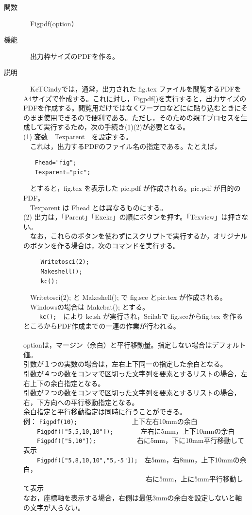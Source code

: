 \documentclass[papersize,a4paper,12pt,uplatex]{jsarticle}
\begin{document}
\begin{description}
\hypertarget{figpdf}{}
\item[関数]　Figpdf(option）
\item[機能]　出力枠サイズのPDFを作る。
\item[説明]　KeTCindyでは，通常，出力された fig.tex ファイルを閲覧するPDFをA4サイズで作成する。これに対し，Figpdf()を実行すると，出力サイズのPDFを作成する。閲覧用だけではなくワープロなどにに貼り込むときにそのまま使用できるので便利である。ただし，そのための親子プロセスを生成して実行するため，次の手続き(1)(2)が必要となる。\\
(1) 変数　Texparent　を設定する。\\
　これは，出力するPDFのファイル名の指定である。たとえば，
\begin{verbatim}
　　Fhead="fig";
　　Texparent="pic";
\end{verbatim}
　とすると，fig.tex を表示した pic.pdf が作成される。pic.pdf が目的のPDF。\\
　Texparent は Fhead とは異なるものにする。\\
(2) 出力は，「Parent」「Exekc」の順にボタンを押す。「Texview」は押さない。\\
　なお，これらのボタンを使わずにスクリプトで実行するか，オリジナルのボタンを作る場合は，次のコマンドを実行する。
\begin{verbatim}
　　　Writetosci(2);
　　　Makeshell();
　　　kc();
\end{verbatim}
　Writetosci(2); と Makeshell(); で fig.sce とpic.tex が作成される。\\
　Windowsの場合は Makebat(); とする。\\　
　\verb|kc();|　により kc.sh が実行され，Scilabで fig.sceからfig.tex を作るところからPDF作成までの一連の作業が行われる。\\
　\\
optionは，マージン（余白）と平行移動量。指定しない場合はデフォルト値。\\
引数が１つの実数の場合は，左右上下同一の指定した余白となる。\\ 
引数が４つの数をコンマで区切った文字列を要素とするリストの場合，左右上下の余白指定となる。\\
引数が２つの数をコンマで区切った文字列を要素とするリストの場合，右，下方向への平行移動指定となる。\\
余白指定と平行移動指定は同時に行うことができる。\\
例： \verb|Figpdf(10);|　　　　　　　　上下左右10mmの余白\\
　　\verb|Figpdf(["5,5,10,10"]);|　　　　左右に5mm，上下10mmの余白\\
　　\verb|Figpdf(["5,10"]);|　　　　　　右に5mm，下に10mm平行移動して表示\\
　　\verb|Figpdf(["5,8,10,10","5,-5"]);|　左5mm，右8mm，上下10mmの余白，\\
　　　　　　　　　　　　　　　　　　右に5mm，上に5mm平行移動して表示\\
なお，座標軸を表示する場合，右側は最低3mmの余白を設定しないと軸の文字が入らない。\\


\end{description}
\end{document}

